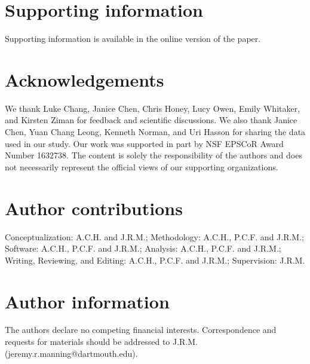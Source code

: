 \documentclass[10pt]{article}
\begin{document}
% 


\section*{Supporting information}
Supporting information is available in the online version of the paper.

\section*{Acknowledgements}
We thank Luke Chang, Janice Chen, Chris Honey, Lucy Owen, Emily Whitaker, and Kirsten Ziman for feedback and scientific discussions. We also thank Janice Chen, Yuan Chang Leong, Kenneth Norman, and Uri Hasson for sharing the data used in our study.  Our work was supported in part by NSF EPSCoR Award Number 1632738. The content is solely the responsibility of the authors and does not necessarily represent the official views of our supporting organizations.

\section*{Author contributions}
Conceptualization: A.C.H. and J.R.M.; Methodology: A.C.H., P.C.F. and J.R.M.; Software: A.C.H., P.C.F. and J.R.M.; Analysis: A.C.H., P.C.F. and J.R.M.; Writing, Reviewing, and Editing: A.C.H., P.C.F. and J.R.M.; Supervision: J.R.M.

\section*{Author information}
The authors declare no competing financial interests.  Correspondence and requests for materials should be addressed to J.R.M. (jeremy.r.manning@dartmouth.edu).
\end{document}
